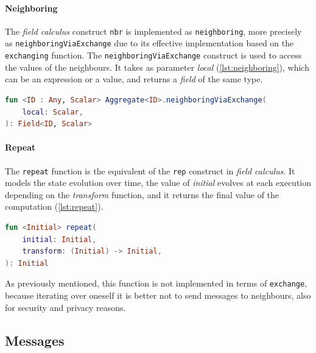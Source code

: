 \paragraph{Neighboring}

The \emph{field calculus} construct \texttt{nbr} is implemented as \texttt{neighboring}, more precisely as \texttt{neighboringViaExchange}
due to its effective implementation based on the \texttt{exchanging} function.
The \texttt{neighboringViaExchange} construct is used to access the values of the neighbours.
It takes as parameter \emph{local} (\ref{lst:neighboring}), which can be an expression or a value, and returns a \emph{field} of the same type.

\begin{lstlisting}[language=kt,label={lst:neighboring}, caption={The signature of the \texttt{neighboringViaExchange} function.}]
fun <ID : Any, Scalar> Aggregate<ID>.neighboringViaExchange(
    local: Scalar,
): Field<ID, Scalar>
\end{lstlisting}


\paragraph{Repeat}
The \texttt{repeat} function is the equivalent of the \texttt{rep} construct in \emph{field calculus}.
It models the state evolution over time, the value of \emph{initial} evolves at each execution depending on the \emph{transform} function,
and it returns the final value of the computation (\ref{lst:repeat}).

\begin{lstlisting}[language=kt,label={lst:repeat}, caption={The signature of the \texttt{repeat} function.}]
fun <Initial> repeat(
    initial: Initial,
    transform: (Initial) -> Initial,
): Initial
\end{lstlisting}

As previously mentioned, this function is not implemented in terms of \texttt{exchange}, because iterating over oneself
it is better not to send messages to neighbours, also for security and privacy reasons.

\subsection{Messages}
\label{subsec:messages}

